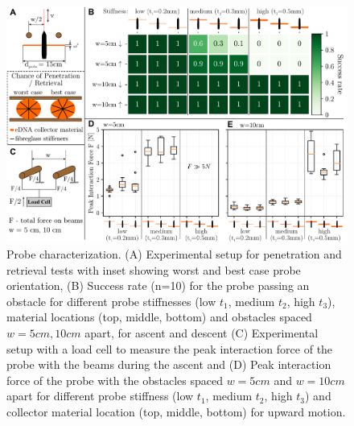 \begin{figure}[tb]
    \centering
    \includegraphics[width=\linewidth]{figures/03_eprobe_results_combined.pdf}
    \caption{Probe characterization. (A) Experimental setup for penetration and retrieval tests with inset showing worst and best case probe orientation, (B) Success rate (n=10) for the probe passing an obstacle for different probe stiffnesses (low $t_1$, medium $t_2$, high $t_3$), material locations (top, middle, bottom) and obstacles spaced $w=5cm, 10cm$ apart, for ascent and descent (C) Experimental setup with a load cell to measure the peak interaction force of the probe with the beams during the ascent and (D) Peak interaction force of the probe with the obstacles spaced $w=5cm$ and $w=10cm$ apart for different probe stiffness (low $t_1$, medium $t_2$, high $t_3$) and collector material location (top, middle, bottom) for upward motion.}
    \label{fig:3-probe-results}
\end{figure}

